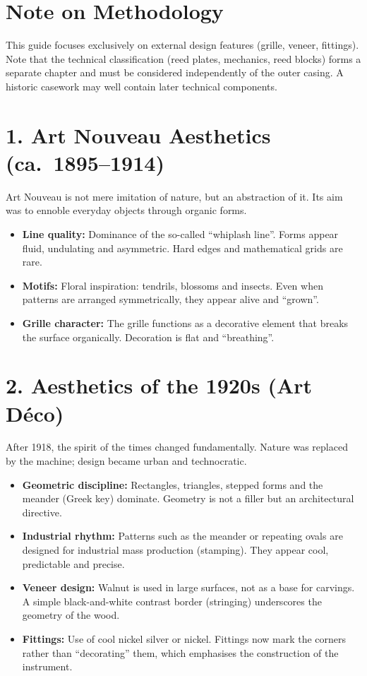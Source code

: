 \documentclass[11pt,a4paper]{article}
\begin{document}
\hbmaketitle

	\section*{Note on Methodology}
	This guide focuses exclusively on external design features (grille, veneer, fittings). Note that the technical classification (reed plates, mechanics, reed blocks) forms a separate chapter and must be considered independently of the outer casing. A historic casework may well contain later technical components.

	\section*{1. Art Nouveau Aesthetics (ca.\ 1895--1914)}
	Art Nouveau is not mere imitation of nature, but an abstraction of it. Its aim was to ennoble everyday objects through organic forms.

	\begin{itemize}
		\item \textbf{Line quality:} Dominance of the so-called ``whiplash line''. Forms appear fluid, undulating and asymmetric. Hard edges and mathematical grids are rare.
		\item \textbf{Motifs:} Floral inspiration: tendrils, blossoms and insects. Even when patterns are arranged symmetrically, they appear alive and ``grown''.
		\item \textbf{Grille character:} The grille functions as a decorative element that breaks the surface organically. Decoration is flat and ``breathing''.
	\end{itemize}

	\section*{2. Aesthetics of the 1920s (Art D\'eco)}
	After 1918, the spirit of the times changed fundamentally. Nature was replaced by the machine; design became urban and technocratic.

	\begin{itemize}
		\item \textbf{Geometric discipline:} Rectangles, triangles, stepped forms and the meander (Greek key) dominate. Geometry is not a filler but an architectural directive.
		\item \textbf{Industrial rhythm:} Patterns such as the meander or repeating ovals are designed for industrial mass production (stamping). They appear cool, predictable and precise.
		\item \textbf{Veneer design:} Walnut is used in large surfaces, not as a base for carvings. A simple black-and-white contrast border (stringing) underscores the geometry of the wood.
		\item \textbf{Fittings:} Use of cool nickel silver or nickel. Fittings now mark the corners rather than ``decorating'' them, which emphasises the construction of the instrument.
	\end{itemize}
\end{document}
